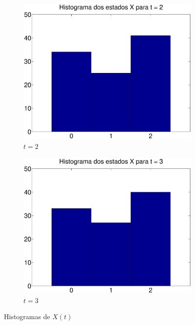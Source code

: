 \documentclass{report}
\begin{document}
\begin{figure}[H]
\begin{subfigure}{0.4\textwidth}
		\includegraphics[width = \textwidth]{Q1_d_histograma_x_2}
		\caption{$t = 2$}
	\end{subfigure}
	\begin{subfigure}{0.4\textwidth}
		\centering
		\includegraphics[width = \textwidth]{Q1_d_histograma_x_3}
		\caption{$t = 3$}
	\end{subfigure}
	\caption{Histogramas de $X(t)$}
	\label{histogramas_estados}
\end{figure}
\end{document}
